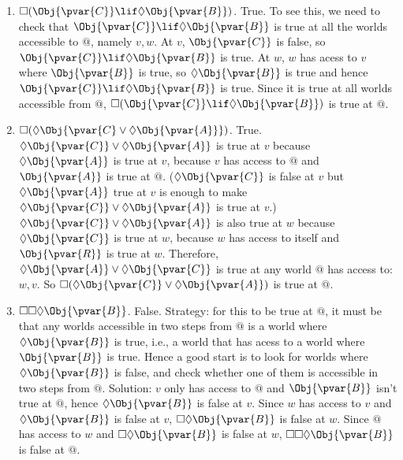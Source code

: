 \documentclass[../../../include/open-logic-section]{subfiles}
\begin{document}
\begin{prob}
\begin{ans}
\begin{enumerate}
            \item $\Box(\Obj{\pvar{C}}\lif\Diamond\Obj{\pvar{B}})$.
            True. To see this, we need to check that
            $\Obj{\pvar{C}}\lif\Diamond\Obj{\pvar{B}}$ is true at all
            the worlds accessible to $@$, namely $v,w$. At $v$,
            $\Obj{\pvar{C}}$ is false, so
            $\Obj{\pvar{C}}\lif\Diamond\Obj{\pvar{B}}$ is true. At
            $w$, $w$ has acess to $v$ where $\Obj{\pvar{B}}$ is true,
            so $\Diamond\Obj{\pvar{B}}$ is true and hence
            $\Obj{\pvar{C}}\lif\Diamond\Obj{\pvar{B}}$ is true. Since 
            it is true at all worlds accessible from $@$, 
            $\Box(\Obj{\pvar{C}}\lif\Diamond\Obj{\pvar{B}})$ is true 
            at $@$.

            \item
            $\Box(\Diamond\Obj{\pvar{C}\lor\Diamond\Obj{\pvar{A}}})$.
            True. $\Diamond\Obj{\pvar{C}} \lor\Diamond\Obj{\pvar{A}}$
            is true at $v$ because $\Diamond\Obj{\pvar{A}}$ is true at
            $v$, because $v$ has access to $@$ and $\Obj{\pvar{A}}$ is
            true at $@$. ($\Diamond\Obj{\pvar{C}}$ is false at $v$ but
            $\Diamond\Obj{\pvar{A}}$ true at $v$ is enough to make
            $\Diamond\Obj{\pvar{C}} \lor\Diamond\Obj{\pvar{A}}$ is
            true at $v$.) $\Diamond\Obj{\pvar{C}}
            \lor\Diamond\Obj{\pvar{A}}$ is also true at $w$ because
            $\Diamond\Obj{\pvar{C}}$ is true at $w$, because $w$ has
            access to itself and $\Obj{\pvar{R}}$ is true at $w$.
            Therefore, $\Diamond\Obj{\pvar{A}}
            \lor\Diamond\Obj{\pvar{C}}$ is true at any world $@$ has
            access to: $w,v$. So $\Box(\Diamond\Obj{\pvar{C}}
            \lor\Diamond\Obj{\pvar{A}})$ is true at $@$.

            \item $\Box\Box\Diamond\Obj{\pvar{B}}$. False. Strategy:
            for this to be true at $@$, it must be that any worlds
            accessible in two steps from $@$ is a world where
            $\Diamond\Obj{\pvar{B}}$ is true, i.e., a world that has
            acess to a world where $\Obj{\pvar{B}}$ is true. Hence a
            good start is to look for worlds where
            $\Diamond\Obj{\pvar{B}}$ is false, and check whether one
            of them is accessible in two steps from $@$. Solution: $v$
            only has access to $@$ and  $\Obj{\pvar{B}}$ isn't true at
            $@$, hence $\Diamond\Obj{\pvar{B}}$ is false at $v$. Since
            $w$ has access to $v$ and $\Diamond\Obj{\pvar{B}}$ is
            false at $v$, $\Box\Diamond\Obj{\pvar{B}}$ is false at
            $w$. Since $@$ has access to $w$ and
            $\Box\Diamond\Obj{\pvar{B}}$ is false at $w$,
            $\Box\Box\Diamond\Obj{\pvar{B}}$ is false at $@$.
        \end{enumerate} 
        
    \end{ans}
    
\end{prob}
\end{document}

